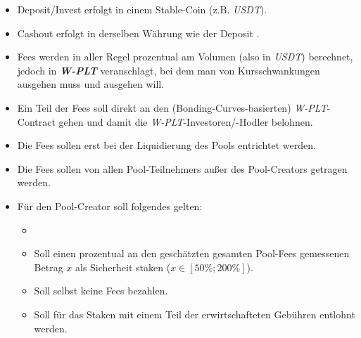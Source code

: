 \vspace{0.3cm}
\vspace{0.5cm}

\begin{Praemisse}

\begin{itemize}
	\item Deposit/Invest erfolgt in einem Stable-Coin (z.B. \textit{USDT}). 
	\item Cashout erfolgt in derselben Währung wie der Deposit . 
	\item Fees werden in aller Regel prozentual am Volumen (also in \textit{USDT}) berechnet, jedoch in \textbf{\textit{W-PLT}} veranschlagt, bei dem man von Kursschwankungen ausgehen muss und ausgehen will. 
	\item Ein Teil der Fees soll direkt an den (Bonding-Curves-basierten) \textit{W-PLT}-Contract gehen und damit die \textit{W-PLT}-Investoren/-Hodler belohnen.
	\item Die Fees sollen  erst bei der Liquidierung des Pools entrichtet werden.
	\item Die Fees sollen von allen Pool-Teilnehmers außer des Pool-Creators getragen werden.
	\item Für den Pool-Creator soll folgendes gelten:
	\begin{itemize}
		\item {}
		\item Soll einen prozentual an den geschätzten gesamten Pool-Fees gemessenen Betrag $x$ als Sicherheit staken ($x \in [50 \%; 200 \%]$). 
		\item Soll selbst keine Fees bezahlen.
		\item Soll für das Staken mit einem Teil der erwirtschafteten Gebühren entlohnt werden.
	\end{itemize}
\end{itemize}

\end{Praemisse}

\vspace{0.5cm}



